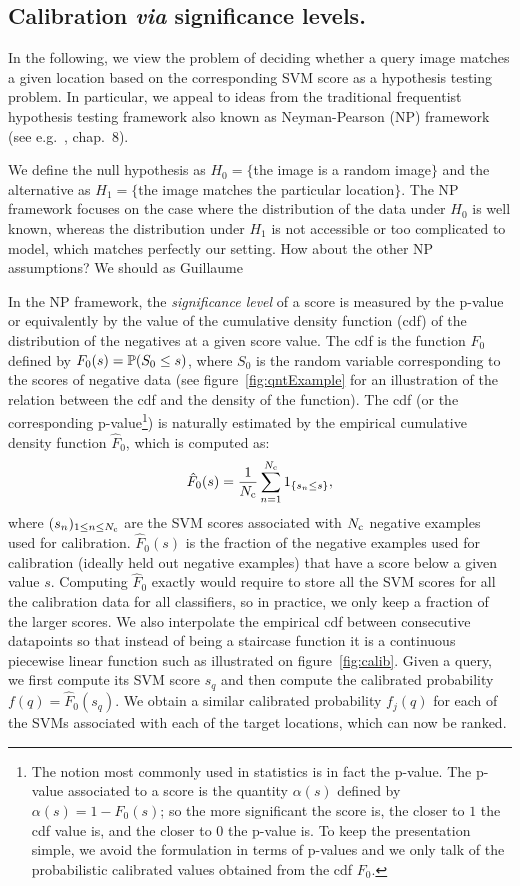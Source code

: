    \subsection{Calibration \emph{via} significance levels.}
      In the following, we view  the problem of deciding whether a query image matches a given location based on the corresponding SVM score as a hypothesis testing problem. In particular, we appeal to ideas from the traditional frequentist hypothesis testing framework also known as Neyman-Pearson (NP) framework (see e.g.~\cite{casella2001statistical}, chap.~8).

      We define the null hypothesis as $H_0=\{$the image is a random image$\}$ and the alternative as $H_1=\{$the image matches the particular location$\}$. The NP framework focuses on the case where the distribution of the data under $H_0$ is well known, whereas the distribution under $H_1$ is not accessible or too complicated to model, which matches perfectly our setting.
      \textcolor{myGrey}{How about the other NP assumptions? We should as Guillaume}

      In the NP framework, the \emph{significance level} of a score is measured by the p-value or equivalently by the value of the cumulative density function  (cdf) of the distribution of the negatives at a given score value. The cdf is the function $F_0$ defined by $F_0(s)=\mathbb{P}(S_0\leq s)$, where $S_0$ is the random variable corresponding to the scores of negative data (see figure~\ref{fig:qntExample} for an illustration of the relation between the cdf and the density of the function). The cdf (or the corresponding p-value\footnote{
      The notion most commonly used in statistics is in fact the p-value. The p-value associated to a score is the quantity $\alpha(s)$ defined by $\alpha(s)=1-F_0(s)$; so the more significant the score is, the closer to $1$ the cdf value is, and the closer to $0$ the p-value is. To keep the presentation simple, we avoid the formulation in terms of p-values and we only talk of the probabilistic calibrated values obtained from the cdf $F_0$.
       })
        is naturally estimated by the empirical cumulative density function $\hat{F}_0$, which is computed as: 
      $$\hat{F}_0(s)=\frac{1}{N_{\text{c}}} \sum_{n=1}^{N_{\text{c}}} 1_{\{s_n \leq s\}},$$
      where $(s_n)_{1\leq n \leq N_{\text{c}} }$ are the SVM scores associated with $N_{\text{c}}$ negative examples used for calibration.
      $\hat{F}_0(s)$ is the fraction of the negative examples used for calibration (ideally held out negative examples) that have a score below a given value $s$.
      Computing $\hat{F}_0$ exactly would require to store all the SVM scores for all the calibration data for all classifiers, so in practice, we only keep a fraction of the larger scores.
      We also interpolate the empirical cdf between consecutive datapoints so that instead of being a staircase function it is a continuous piecewise linear function such as illustrated on figure~\ref{fig:calib}. Given a query, we first compute its SVM score $s_q$ and then compute the calibrated probability $f(q)=\hat{F}_0(s_q)$.
      We obtain a similar calibrated probability $f_j(q)$ for each of the SVMs associated with each of the target locations, which can now be ranked.

